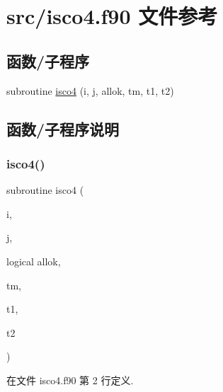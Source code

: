 \hypertarget{isco4_8f90}{}\section{src/isco4.f90 文件参考}
\label{isco4_8f90}
\subsection*{函数/子程序}
\begin{DoxyCompactItemize}
\item 
subroutine \mbox{\hyperlink{isco4_8f90_a70a766e747f84724c99301dba9dcbae8}{isco4}} (i, j, allok, tm, t1, t2)
\end{DoxyCompactItemize}


\subsection{函数/子程序说明}
\mbox{\label{isco4_8f90_a70a766e747f84724c99301dba9dcbae8}} 
\subsubsection{\texorpdfstring{isco4()}{isco4()}}
{\footnotesize\ttfamily subroutine isco4 (\begin{DoxyParamCaption}\item[{}]{i,  }\item[{}]{j,  }\item[{logical}]{allok,  }\item[{}]{tm,  }\item[{}]{t1,  }\item[{}]{t2 }\end{DoxyParamCaption})}



在文件 isco4.\+f90 第 2 行定义.

